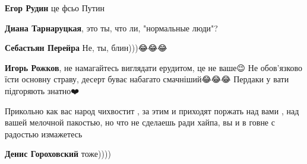\begin{itemize}
\begin{itemize}
 
\textbf{Егор Рудин} це фсьо Путин

 
\textbf{Диана Тарнаруцкая}, это ты, что ли, "нормальные люди"?

 
\textbf{Себастьян Перейра}
Не, ты, блин)))😂😂😂

 
\textbf{Игорь Рожков}, не намагайтесь виглядати ерудитом, це не ваше😉 Не обов'язково їсти основну страву, десерт буває набагато смачніший😂😂😂 Пердаки у вати підгоряють знатно❤️

 
Прикольно как вас народ чихвостит , за этим и приходят поржать над вами , над вашей мелочной пакостью, но что не сделаешь ради хайпа, вы и в говне с радостью измажетесь

 
\textbf{Денис Гороховский} тоже))))

 

\end{itemize}
\end{itemize}
